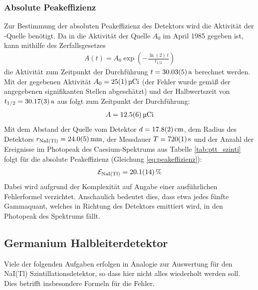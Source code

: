 \documentclass[11pt, a4paper]{article}
\numberwithin{equation}{section}
\newcommand{\cs}{\isotope[137]{Cs}}
\begin{document}
\subsubsection{Absolute Peakeffizienz}
\label{sec:absolute_peakeffizienz_szinti}
Zur Bestimmung der absoluten Peakeffizienz des Detektors wird die Aktivität der \cs{}-Quelle benötigt. Da in \cite{anleitung} die Aktivität der Quelle $A_0$ im April 1985 gegeben ist, kann mithilfe des Zerfallsgesetzes
\begin{align}
	A(t) = A_0 \exp\left( - \frac{\ln(2)\, t}{t_{1/2}} \right)
\end{align}
die Aktivität zum Zeitpunkt der Durchführung $t = \SI{30.03 +- 0.05}{a}$ berechnet werden.
Mit der gegebenen Aktivität $A_0 = \SI{25 +- 1}{\micro Ci}$ (der Fehler wurde gemäß der angegebenen signifikanten Stellen abgeschätzt) und der Halbwertszeit von \cs{} $t_{1/2} = \SI{30.17 +- 0.03}{a}$ aus \cite{nist} folgt zum Zeitpunkt der Durchführung:
\begin{align}
	\label{eq:aktivitaet_caesium}
	A = \SI{12.5 +- 0.6}{\micro Ci}
\end{align}
Mit dem Abstand der Quelle vom Detektor $d = \SI{17.8 +- 0.2}{cm}$, dem Radius des Detektors $r_\mathrm{NaI(Tl)} = \SI{24 +- 0.5}{mm}$, der Messdauer $T = \SI{720 +- 1}{\second}$ und der Anzahl der Ereignisse im Photopeak des Caesium-Spektrums aus Tabelle \ref{tab:ptt_szinti} folgt für die absolute Peakeffizienz (Gleichung \ref{eq:peakeffizienz}):
\begin{align}
	\mathcal{E}_\mathrm{NaI(Tl)} = \SI{20.1 +- 1.4}{\percent}
\end{align}
Dabei wird aufgrund der Komplexität auf Angabe einer ausführlichen Fehlerformel verzichtet.
Anschaulich bedeutet dies, dass etwa jedes fünfte Gammaquant, welches in Richtung des Detektors emittiert wird, in den Photopeak des Spektrums fällt.

\subsection{Germanium Halbleiterdetektor}
Viele der folgenden Aufgaben erfolgen in Analogie zur Auswertung für den NaI(Tl) Szintillationsdetektor, so dass hier nicht alles wiederholt werden soll.
Dies betrifft insbesondere Formeln für die Fehler.
\end{document}
